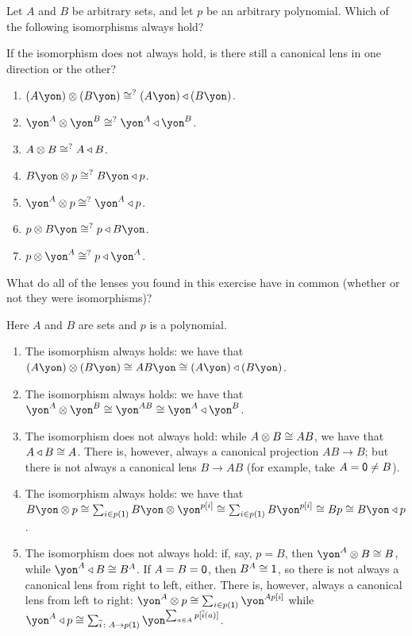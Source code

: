 \documentclass[Book-Poly]{subfiles}
\begin{document}
\begin{exercise}
Let $A$ and $B$ be arbitrary sets, and let $p$ be an arbitrary polynomial.
Which of the following isomorphisms always hold?

If the isomorphism does not always hold, is there still a canonical lens in one direction or the other?
\begin{enumerate}
	\item $(A\yon)\otimes(B\yon) \iso^? (A\yon)\tri (B\yon)$.
	\item $\yon^A\otimes\yon^B\iso^?\yon^A\tri\yon^B$.
	\item $A\otimes B\cong^? A\mathbin{\triangleleft} B$.
	\item $B\yon\otimes p\iso^? B\yon\tri p$.
	\item $\yon^A\otimes p\iso^? \yon^A\tri p$.
	\item $p\otimes B\yon\iso^? p\tri B\yon$.
	\item $p\otimes \yon^A\iso^? p\tri\yon^A$.
	\qedhere
\end{enumerate}
What do all of the lenses you found in this exercise have in common (whether or not they were isomorphisms)?
\begin{solution}
Here $A$ and $B$ are sets and $p$ is a polynomial.
\begin{enumerate}
	\item The isomorphism always holds: we have that $(A\yon)\otimes(B\yon) \iso AB\yon \iso (A\yon)\tri (B\yon)$.
	\item The isomorphism always holds: we have that $\yon^A\otimes\yon^B \iso \yon^{AB} \iso \yon^A\tri\yon^B$.
	\item The isomorphism does not always hold: while $A\otimes B \cong AB$, we have that $A\mathbin{\triangleleft} B \cong A$.
	There is, however, always a canonical projection $AB\to B$; but there is not always a canonical lens $B\to AB$ (for example, take $A=\textsf{0}\neq B$).
	\item The isomorphism always holds: we have that $B\yon \otimes p \iso \sum_{i \in p(\1)} B\yon \otimes \yon^{p[i]} \iso \sum_{i \in p(\1)} B\yon^{p[i]} \iso Bp \iso B\yon\tri p$.
	\item The isomorphism does not always hold: if, say, $p = B$, then $\yon^A \otimes B \iso B$, while $\yon^A \tri B \iso B^A$.
	If $A=B=\textsf{0}$, then $B^A\cong\textsf{1}$, so there is not always a canonical lens from right to left, either.
	There is, however, always a canonical lens from left to right: $\yon^A\otimes p\iso\sum_{i \in p(\1)}\yon^{Ap[i]}$ while $\yon^A\tri p\iso\sum_{\ol{i}\colon A\to p(\1)}\yon^{\sum_{a\in A}p[\ol{i}(a)]}$.

\end{enumerate}
\end{solution}
\end{exercise}
\end{document}
